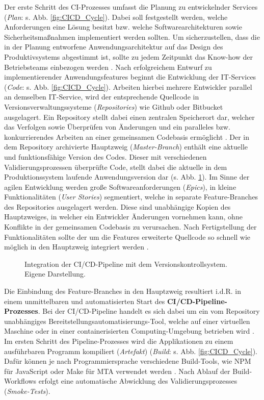 Der erste Schritt des CI-Prozesses umfasst die Planung zu entwickelnder Services (\textit{Plan}: s. Abb. \ref*{fig:CICD_Cycle}). Dabei soll festgestellt werden, welche Anforderungen eine Lösung besitzt bzw. welche Softwarearchitekturen sowie Sicherheitsmaßnahmen implementiert werden sollten. Um sicherzustellen, dass die in der Planung entworfene Anwendungsarchitektur auf das Design des Produktivsystems abgestimmt ist, sollte zu jedem Zeitpunkt das Know-how der Betriebsteams einbezogen werden \cite[16]{Halstenberg.2020}. Nach erfolgreichem Entwurf zu implementierender Anwendungsfeatures beginnt die Entwicklung der IT-Services (\textit{Code}: s. Abb. \ref*{fig:CICD_Cycle}). Arbeiten hierbei mehrere Entwickler parallel an demselben IT-Service, wird der entsprechende Quellcode in Versionsverwaltungssysteme (\textit{Repositories}) wie Github oder Bitbucket ausgelagert. Ein Repository stellt dabei einen zentralen Speicherort dar, welcher das Verfolgen sowie Überprüfen von Änderungen und ein paralleles bzw. konkurrierendes Arbeiten an einer gemeinsamen Codebasis ermöglicht \cite[31]{Loeliger.2012}. Der in dem Repository archivierte Hauptzweig (\textit{Master-Branch}) enthält eine aktuelle und funktionsfähige Version des Codes. Dieser mit verschiedenen Validierungsprozessen überprüfte Code, stellt dabei die aktuelle in dem Produktionssystem laufende Anwendungsversion dar (s. Abb. \ref*{fig:VCS}). Im Sinne der agilen Entwicklung werden große Softwareanforderungen (\textit{Epics}), in kleine Funktionalitäten (\textit{User Stories}) segmentiert, welche in separate Feature-Branches des Repositories ausgelagert werden. Diese sind unabhängige Kopien des Hauptzweiges, in welcher ein Entwickler Änderungen vornehmen kann, ohne Konflikte in der gemeinsamen Codebasis zu verursachen. Nach Fertigstellung der Funktionalitäten sollte der um die Features erweiterte Quellcode so schnell wie möglich in den Hauptzweig integriert werden \cite[169]{Loeliger.2012}.
\begin{center}
	\begin{figure}[H]
		\centering
		\caption[Integration der CI/CD-Pipeline mit dem Versionskontrollsystem]{Integration der CI/CD-Pipeline mit dem Versionskontrollsystem. Eigene Darstellung.}
		\label{fig:VCS}
	\end{figure}
\end{center}
\vspace*{-10mm}
Die Einbindung des Feature-Branches in den Hauptzweig resultiert i.d.R. in einem unmittelbaren und automatisierten Start des \textbf{CI/CD-Pipeline-Prozesses}. Bei der CI/CD-Pipeline handelt es sich dabei um ein vom Repository unabhängiges Bereitstellungsautomatisierungs-Tool, welche auf einer virtuellen Maschine oder in einer containerisierten Computing-Umgebung betrieben wird \cite[Kap. 1.2]{Labouardy.2021}. Im ersten Schritt des Pipeline-Prozesses wird die Applikationen zu einem ausführbaren Programm kompiliert (\textit{Artefakt}) (\textit{Build}: s. Abb. \ref*{fig:CICD_Cycle}). Dafür können je nach Programmiersprache verschiedene Build-Tools, wie NPM für JavaScript oder Make für \ac{MTA} verwendet werden \cite[Kap. 7.1]{Labouardy.2021}. Nach Ablauf der Build-Workflows erfolgt eine automatische Abwicklung des Validierungsprozesses (\textit{Smoke-Tests}).
